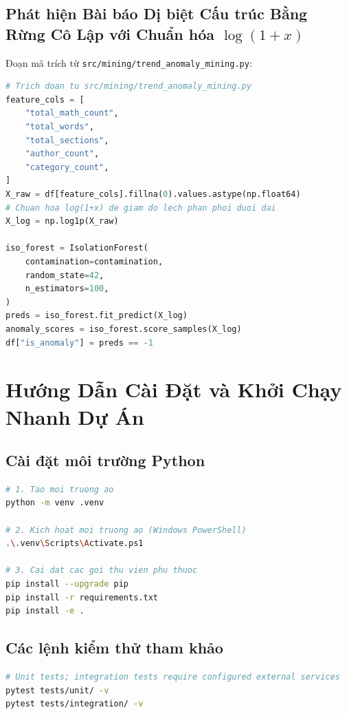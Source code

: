 \subsection{Phát hiện Bài báo Dị biệt Cấu trúc Bằng Rừng Cô Lập với Chuẩn hóa $\log(1+x)$}
Đoạn mã trích từ \texttt{src/mining/trend\_anomaly\_mining.py}:

\begin{lstlisting}[language=Python, caption={Isolation Forest tren dac trung log1p}]
# Trich doan tu src/mining/trend_anomaly_mining.py
feature_cols = [
    "total_math_count",
    "total_words",
    "total_sections",
    "author_count",
    "category_count",
]
X_raw = df[feature_cols].fillna(0).values.astype(np.float64)
# Chuan hoa log(1+x) de giam do lech phan phoi duoi dai
X_log = np.log1p(X_raw)

iso_forest = IsolationForest(
    contamination=contamination,
    random_state=42,
    n_estimators=100,
)
preds = iso_forest.fit_predict(X_log)
anomaly_scores = iso_forest.score_samples(X_log)
df["is_anomaly"] = preds == -1
\end{lstlisting}

\section{Hướng Dẫn Cài Đặt và Khởi Chạy Nhanh Dự Án}

\subsection{Cài đặt môi trường Python}
\begin{lstlisting}[language=bash]
# 1. Tao moi truong ao
python -m venv .venv

# 2. Kich hoat moi truong ao (Windows PowerShell)
.\.venv\Scripts\Activate.ps1

# 3. Cai dat cac goi thu vien phu thuoc
pip install --upgrade pip
pip install -r requirements.txt
pip install -e .
\end{lstlisting}

\subsection{Các lệnh kiểm thử tham khảo}
\begin{lstlisting}[language=bash]
# Unit tests; integration tests require configured external services
pytest tests/unit/ -v
pytest tests/integration/ -v
\end{lstlisting}
